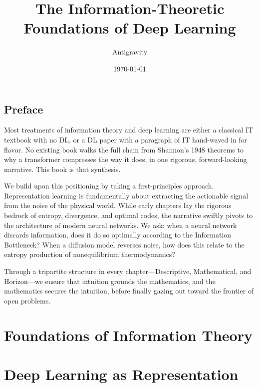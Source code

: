 \documentclass[11pt,twoside,openright]{book}
\title{The Information-Theoretic Foundations of Deep Learning}
\author{Antigravity}
\date{\today}
\begin{document}
\frontmatter
\maketitle

\chapter*{Preface}

Most treatments of information theory and deep learning are either a classical IT textbook with no DL, or a DL paper with a paragraph of IT hand-waved in for flavor. No existing book walks the full chain from Shannon's 1948 theorems to why a transformer compresses the way it does, in one rigorous, forward-looking narrative. This book is that synthesis.

We build upon this positioning by taking a first-principles approach. Representation learning is fundamentally about extracting the actionable signal from the noise of the physical world. While early chapters lay the rigorous bedrock of entropy, divergence, and optimal codes, the narrative swiftly pivots to the architecture of modern neural networks. We ask: when a neural network discards information, does it do so optimally according to the Information Bottleneck? When a diffusion model reverses noise, how does this relate to the entropy production of nonequilibrium thermodynamics? 

Through a tripartite structure in every chapter---Descriptive, Mathematical, and Horizon---we ensure that intuition grounds the mathematics, and the mathematics secures the intuition, before finally gazing out toward the frontier of open problems.



\tableofcontents

\mainmatter

\part{Foundations of Information Theory}





\part{Deep Learning as Representation}



\end{document}
